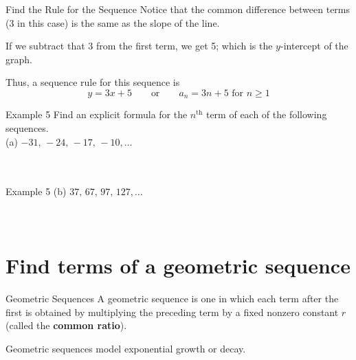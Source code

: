 \documentclass[t,usenames,dvipsnames]{beamer}
\begin{document}
\begin{frame}{Find the Rule for the Sequence}
Notice that the common difference between terms (3 in this case) is the same as the slope of the line.	\newline\\  \pause

If we subtract that 3 from the first term, we get 5; which is the $y$-intercept of the graph.	\newline\\  \pause

Thus, a sequence rule for this sequence is 
\[
y = 3x + 5 \qquad	\text{or}	\qquad	a_n = 3n+5 \text{ for } n \geq 1
\]
\end{frame}

\begin{frame}{Example 5}
Find an explicit formula for the $n^\text{th}$ term of each of the following sequences. \newline\\
(a) \quad $-31, \, -24, \, -17, \, -10, \dots$  \newline\\

    \newline\\
 \newline\\
\end{frame}

\begin{frame}{Example 5}
(b) \quad $37, \, 67, \, 97, \, 127, \dots$ \newline\\

    \newline\\
 \newline\\
\end{frame}

\section{Find terms of a geometric sequence}

\begin{frame}{Geometric Sequences}
A \alert{geometric sequence} is one in which each term after the first is obtained by multiplying the preceding term by a fixed nonzero constant $r$ (called the {\color{blue}\textbf{common ratio}}). \newline\\  \pause

Geometric sequences model exponential growth or decay.  \newline\\
\end{frame}
\end{document}
